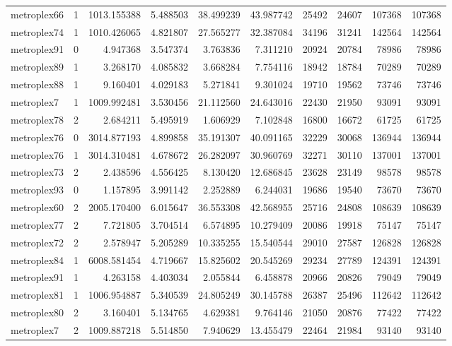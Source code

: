 \begin{longtable}{|l|r|r|r|r|r|r|r|r|r|}
metroplex66 & 1 & 1013.155388 & 5.488503 & 38.499239 & 43.987742 & 25492 & 24607 & 107368 & 107368 \\
metroplex74 & 1 & 1010.426065 & 4.821807 & 27.565277 & 32.387084 & 34196 & 31241 & 142564 & 142564 \\
metroplex91 & 0 & 4.947368 & 3.547374 & 3.763836 & 7.311210 & 20924 & 20784 & 78986 & 78986 \\
metroplex89 & 1 & 3.268170 & 4.085832 & 3.668284 & 7.754116 & 18942 & 18784 & 70289 & 70289 \\
metroplex88 & 1 & 9.160401 & 4.029183 & 5.271841 & 9.301024 & 19710 & 19562 & 73746 & 73746 \\
metroplex7 & 1 & 1009.992481 & 3.530456 & 21.112560 & 24.643016 & 22430 & 21950 & 93091 & 93091 \\
metroplex78 & 2 & 2.684211 & 5.495919 & 1.606929 & 7.102848 & 16800 & 16672 & 61725 & 61725 \\
metroplex76 & 0 & 3014.877193 & 4.899858 & 35.191307 & 40.091165 & 32229 & 30068 & 136944 & 136944 \\
metroplex76 & 1 & 3014.310481 & 4.678672 & 26.282097 & 30.960769 & 32271 & 30110 & 137001 & 137001 \\
metroplex73 & 2 & 2.438596 & 4.556425 & 8.130420 & 12.686845 & 23628 & 23149 & 98578 & 98578 \\
metroplex93 & 0 & 1.157895 & 3.991142 & 2.252889 & 6.244031 & 19686 & 19540 & 73670 & 73670 \\
metroplex60 & 2 & 2005.170400 & 6.015647 & 36.553308 & 42.568955 & 25716 & 24808 & 108639 & 108639 \\
metroplex77 & 2 & 7.721805 & 3.704514 & 6.574895 & 10.279409 & 20086 & 19918 & 75147 & 75147 \\
metroplex72 & 2 & 2.578947 & 5.205289 & 10.335255 & 15.540544 & 29010 & 27587 & 126828 & 126828 \\
metroplex84 & 1 & 6008.581454 & 4.719667 & 15.825602 & 20.545269 & 29234 & 27789 & 124391 & 124391 \\
metroplex91 & 1 & 4.263158 & 4.403034 & 2.055844 & 6.458878 & 20966 & 20826 & 79049 & 79049 \\
metroplex81 & 1 & 1006.954887 & 5.340539 & 24.805249 & 30.145788 & 26387 & 25496 & 112642 & 112642 \\
metroplex80 & 2 & 3.160401 & 5.134765 & 4.629381 & 9.764146 & 21050 & 20876 & 77422 & 77422 \\
metroplex7 & 2 & 1009.887218 & 5.514850 & 7.940629 & 13.455479 & 22464 & 21984 & 93140 & 93140 \\

\end{longtable}

